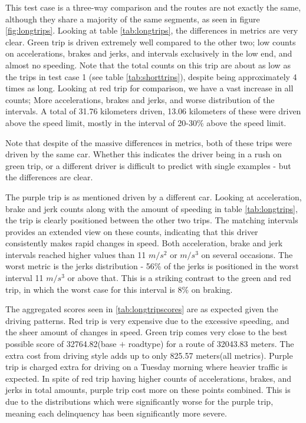 This test case is a three-way comparison and the routes are not exactly the same, although they share a majority of the same segments, as seen in figure \ref{fig:longtrips}. Looking at table \ref{tab:longtrips}, the differences in metrics are very clear. Green trip is driven extremely well compared to the other two; low counts on accelerations, brakes and jerks, and intervals exclusively in the low end, and almost no speeding. Note that the total counts on this trip are about as low as the trips in test case 1 (see table \ref{tab:shorttrips}), despite being approximately 4 times as long.
Looking at red trip for comparison, we have a vast increase in all counts; More accelerations, brakes and jerks, and worse distribution of the intervals. A total of 31.76 kilometers driven, 13.06 kilometers of these were driven above the speed limit, mostly in the interval of 20-30\% above the speed limit.

Note that despite of the massive differences in metrics, both of these trips were driven by the same car. Whether this indicates the driver being in a rush on green trip, or a different driver is difficult to predict with single examples - but the differences are clear.

The purple trip is as mentioned driven by a different car. Looking at acceleration, brake and jerk counts along with the amount of speeding in table \ref{tab:longtrips}, the trip is clearly positioned between the other two trips. The matching intervals provides an extended view on these counts, indicating that this driver consistently makes rapid changes in speed. Both acceleration, brake and jerk intervals reached higher values than 11 $m/s^2$ or $m/s^3$ on several occasions. The worst metric is the jerks distribution - 56\% of the jerks is positioned in the worst interval 11 $m/s^3$ or above that. This is a striking contrast to the green and red trip, in which the worst case for this interval is 8\% on braking.

The aggregated scores seen in \ref{tab:longtripscores} are as expected given the driving patterns. Red trip is very expensive due to the excessive speeding, and the sheer amount of changes in speed. Green trip comes very close to the best possible score of 32764.82(base $+$ roadtype) for a route of 32043.83 meters. The extra cost from driving style adds up to only 825.57 meters(all metrics). Purple trip is charged extra for driving on a Tuesday morning where heavier traffic is expected. In spite of red trip having higher counts of accelerations, brakes, and jerks in total amounts, purple trip cost more on these points combined. This is due to the distributions which were significantly worse for the purple trip, meaning each delinquency has been significantly more severe.

